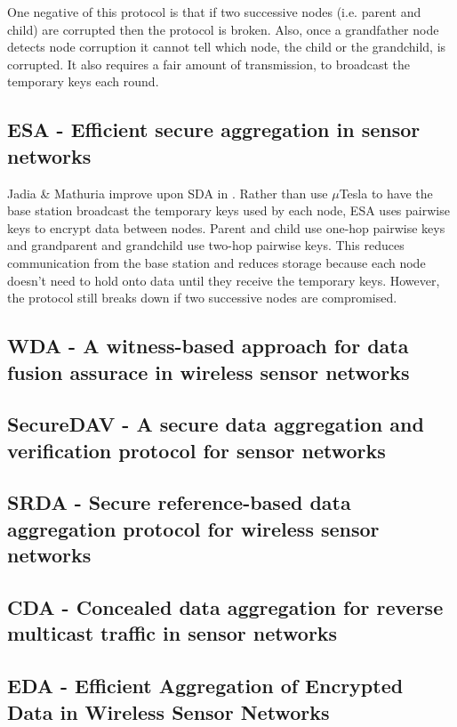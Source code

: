 \documentclass[a4paper]{article}
\begin{document}
One negative of this protocol is that if two successive nodes (i.e. parent and
child) are corrupted then the protocol is broken. Also, once a grandfather
node detects node corruption it cannot tell which node, the child or the
grandchild, is corrupted. It also requires a fair amount of transmission, to
broadcast the temporary keys each round.

\subsection{ESA - Efficient secure aggregation in sensor networks}
Jadia \& Mathuria improve upon SDA in \cite{ESA}. Rather than use $\mu$Tesla
to have the base station broadcast the temporary keys used by each node, ESA
uses pairwise keys to encrypt data between nodes. Parent and child use one-hop
pairwise keys and grandparent and grandchild use two-hop pairwise keys. This
reduces communication from the base station and reduces storage because each
node doesn't need to hold onto data until they receive the temporary
keys. However, the protocol still breaks down if two successive nodes are
compromised.

\subsection{WDA - A witness-based approach for data fusion assurace in wireless sensor networks}

\subsection{SecureDAV - A secure data aggregation and verification protocol for sensor networks}

\subsection{SRDA - Secure reference-based data aggregation protocol for wireless sensor networks}

\subsection{CDA - Concealed data aggregation for reverse multicast traffic in sensor networks}

\subsection{EDA - Efficient Aggregation of Encrypted Data in Wireless Sensor Networks}
\end{document}
